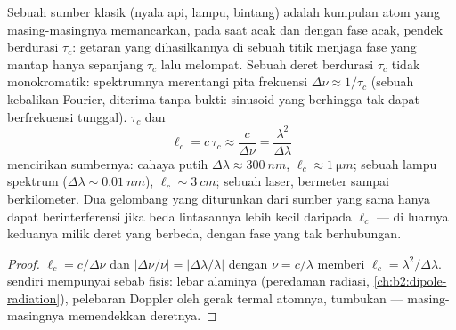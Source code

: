 \begin{proposition}\label{prop:b2:scalar-light-model:coherence}
Sebuah sumber klasik (nyala api, lampu, bintang) adalah kumpulan atom
yang masing-masingnya memancarkan, pada saat acak dan dengan fase acak,
\emph{} pendek berdurasi $\tau_c$: getaran yang dihasilkannya di sebuah
titik menjaga fase yang mantap hanya sepanjang $\tau_c$ lalu melompat. Sebuah deret
berdurasi $\tau_c$ tidak monokromatik: spektrumnya merentangi pita
frekuensi $\Delta\nu \approx 1/\tau_c$ (sebuah kebalikan Fourier, diterima tanpa bukti: sinusoid
yang berhingga tak dapat berfrekuensi tunggal). \emph{}
$\tau_c$ dan \emph{}
\[
\ell_c = c\,\tau_c \approx \frac c{\Delta\nu} = \frac{\lambda^2}{\Delta\lambda}
\]
mencirikan sumbernya: cahaya putih $\Delta\lambda \approx \qty{300}{nm}$, $\ell_c
\approx \qty{1}{\micro m}$; sebuah lampu spektrum ($\Delta\lambda \sim \qty{0.01}{nm}$), $\ell_c \sim
\qty{3}{cm}$; sebuah laser, bermeter sampai berkilometer. Dua gelombang yang diturunkan dari
sumber yang sama hanya dapat berinterferensi jika beda lintasannya lebih kecil
daripada $\ell_c$ --- di luarnya keduanya milik deret yang berbeda, dengan
fase yang tak berhubungan.
\end{proposition}

\begin{proof}
$\ell_c = c/\Delta\nu$ dan $|\Delta\nu/\nu| = |\Delta\lambda/\lambda|$ dengan $\nu = c/\lambda$ memberi $\ell_c =
\lambda^2/\Delta\lambda$.  sendiri mempunyai sebab fisis: lebar
alaminya (peredaman radiasi, \cref{ch:b2:dipole-radiation}),
pelebaran Doppler oleh gerak termal atomnya, tumbukan --- masing-masingnya
memendekkan deretnya.
\end{proof}

